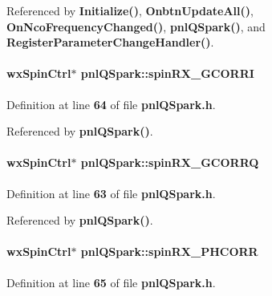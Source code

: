 Referenced by {\bf Initialize()}, {\bf Onbtn\+Update\+All()}, {\bf On\+Nco\+Frequency\+Changed()}, {\bf pnl\+Q\+Spark()}, and {\bf Register\+Parameter\+Change\+Handler()}.

\paragraph[{spin\+R\+X\+\_\+\+G\+C\+O\+R\+RI}]{\setlength{\rightskip}{0pt plus 5cm}wx\+Spin\+Ctrl$\ast$ pnl\+Q\+Spark\+::spin\+R\+X\+\_\+\+G\+C\+O\+R\+RI}\label{classpnlQSpark_a268ff796af1c81f30f0f78663f49050c}


Definition at line {\bf 64} of file {\bf pnl\+Q\+Spark.\+h}.



Referenced by {\bf pnl\+Q\+Spark()}.

\paragraph[{spin\+R\+X\+\_\+\+G\+C\+O\+R\+RQ}]{\setlength{\rightskip}{0pt plus 5cm}wx\+Spin\+Ctrl$\ast$ pnl\+Q\+Spark\+::spin\+R\+X\+\_\+\+G\+C\+O\+R\+RQ}\label{classpnlQSpark_a6a34580912ab472c4c05104d61dad20f}


Definition at line {\bf 63} of file {\bf pnl\+Q\+Spark.\+h}.



Referenced by {\bf pnl\+Q\+Spark()}.

\paragraph[{spin\+R\+X\+\_\+\+P\+H\+C\+O\+RR}]{\setlength{\rightskip}{0pt plus 5cm}wx\+Spin\+Ctrl$\ast$ pnl\+Q\+Spark\+::spin\+R\+X\+\_\+\+P\+H\+C\+O\+RR}\label{classpnlQSpark_afc40bf28aa036560ff9c38b9608934dc}


Definition at line {\bf 65} of file {\bf pnl\+Q\+Spark.\+h}.



